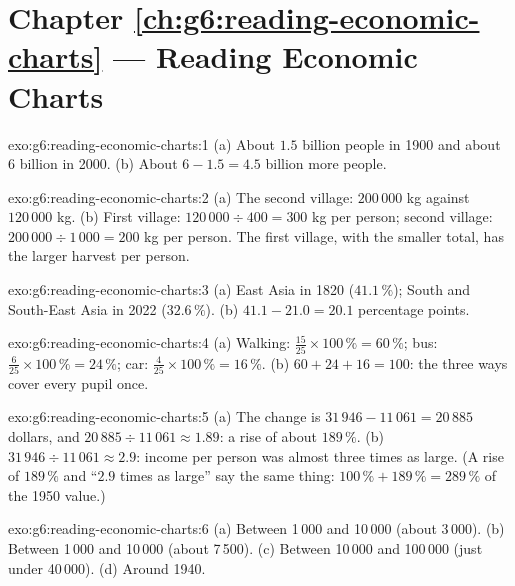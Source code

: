 \section*{Chapter \ref{ch:g6:reading-economic-charts} --- Reading Economic Charts}

\begin{solution}{exo:g6:reading-economic-charts:1}
(a) About $1.5$ billion people in 1900 and about $6$ billion in 2000.
(b) About $6 - 1.5 = 4.5$ billion more people.
\end{solution}

\begin{solution}{exo:g6:reading-economic-charts:2}
(a) The second village: $200\,000$ kg against $120\,000$ kg.
(b) First village: $120\,000 \div 400 = 300$ kg per person; second village:
$200\,000 \div 1\,000 = 200$ kg per person. The first village, with the smaller
total, has the larger harvest per person.
\end{solution}

\begin{solution}{exo:g6:reading-economic-charts:3}
(a) East Asia in 1820 ($41.1\,\%$); South and South-East Asia in 2022
($32.6\,\%$). (b) $41.1 - 21.0 = 20.1$ percentage points.
\end{solution}

\begin{solution}{exo:g6:reading-economic-charts:4}
(a) Walking: $\frac{15}{25} \times 100\,\% = 60\,\%$; bus:
$\frac{6}{25} \times 100\,\% = 24\,\%$; car: $\frac{4}{25} \times 100\,\% = 16\,\%$.
(b) $60 + 24 + 16 = 100$: the three ways cover every pupil once.
\end{solution}

\begin{solution}{exo:g6:reading-economic-charts:5}
(a) The change is $31\,946 - 11\,061 = 20\,885$ dollars, and
$20\,885 \div 11\,061 \approx 1.89$: a rise of about $189\,\%$.
(b) $31\,946 \div 11\,061 \approx 2.9$: income per person was almost three times
as large. (A rise of $189\,\%$ and ``$2.9$ times as large'' say the same thing:
$100\,\% + 189\,\% = 289\,\%$ of the 1950 value.)
\end{solution}

\begin{solution}{exo:g6:reading-economic-charts:6}
(a) Between 1\,000 and 10\,000 (about 3\,000). (b) Between 1\,000 and 10\,000
(about 7\,500). (c) Between 10\,000 and 100\,000 (just under 40\,000).
(d) Around 1940.
\end{solution}

